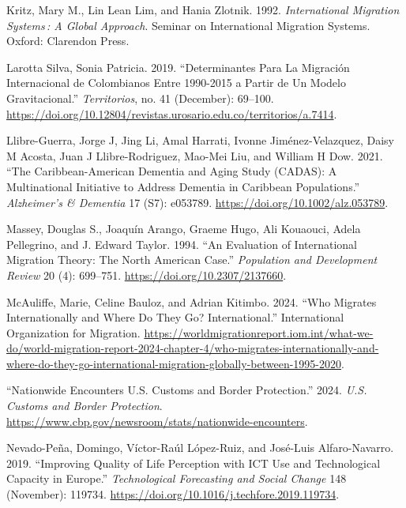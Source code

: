 \documentclass[
]{article}
\newlength{\cslhangindent}
\newenvironment{CSLReferences}[2] %
 {\begin{list}{}{%
  \setlength{\itemindent}{0pt}
  \setlength{\leftmargin}{0pt}
  \setlength{\parsep}{0pt}
  \ifodd #1
   \setlength{\leftmargin}{\cslhangindent}
   \setlength{\itemindent}{-1\cslhangindent}
  \fi
  \setlength{\itemsep}{#2\baselineskip}}}
 {\end{list}}
\begin{document}
\begin{CSLReferences}{1}{0}
Kritz, Mary M., Lin Lean Lim, and Hania Zlotnik. 1992.
\emph{International {Migration} {Systems}\,: {A} {Global} {Approach}}.
Seminar on {International} {Migration} {Systems}. Oxford: Clarendon
Press.

Larotta Silva, Sonia Patricia. 2019. {``Determinantes Para La Migración
Internacional de Colombianos Entre 1990-2015 a Partir de Un Modelo
Gravitacional.''} \emph{Territorios}, no. 41 (December): 69--100.
\url{https://doi.org/10.12804/revistas.urosario.edu.co/territorios/a.7414}.

Llibre-Guerra, Jorge J, Jing Li, Amal Harrati, Ivonne Jiménez-Velazquez,
Daisy M Acosta, Juan J Llibre-Rodriguez, Mao-Mei Liu, and William H Dow.
2021. {``The {Caribbean}-{American} {Dementia} and {Aging} {Study}
({CADAS}): {A} Multinational Initiative to Address Dementia in
{Caribbean} Populations.''} \emph{Alzheimer's \& Dementia} 17 (S7):
e053789. \url{https://doi.org/10.1002/alz.053789}.

Massey, Douglas S., Joaquín Arango, Graeme Hugo, Ali Kouaouci, Adela
Pellegrino, and J. Edward Taylor. 1994. {``An {Evaluation} of
{International} {Migration} {Theory}: {The} {North} {American}
{Case}.''} \emph{Population and Development Review} 20 (4): 699--751.
\url{https://doi.org/10.2307/2137660}.

McAuliffe, Marie, Celine Bauloz, and Adrian Kitimbo. 2024. {``Who
Migrates Internationally and Where Do They Go? {International}.''}
International Organization for Migration.
\url{https://worldmigrationreport.iom.int/what-we-do/world-migration-report-2024-chapter-4/who-migrates-internationally-and-where-do-they-go-international-migration-globally-between-1995-2020}.

{``Nationwide {Encounters} {\textbar} {U}.{S}. {Customs} and {Border}
{Protection}.''} 2024. \emph{U.S. Customs and Border Protection}.
\url{https://www.cbp.gov/newsroom/stats/nationwide-encounters}.

Nevado-Peña, Domingo, Víctor-Raúl López-Ruiz, and José-Luis
Alfaro-Navarro. 2019. {``Improving Quality of Life Perception with {ICT}
Use and Technological Capacity in {Europe}.''} \emph{Technological
Forecasting and Social Change} 148 (November): 119734.
\url{https://doi.org/10.1016/j.techfore.2019.119734}.


\end{CSLReferences}
\end{document}

